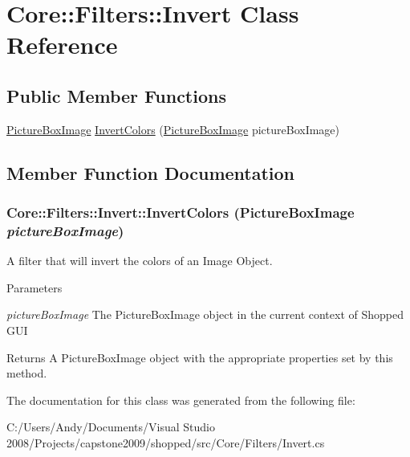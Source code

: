 \hypertarget{class_core_1_1_filters_1_1_invert}{
\section{Core::Filters::Invert Class Reference}
\label{class_core_1_1_filters_1_1_invert}
}
\subsection*{Public Member Functions}
\begin{DoxyCompactItemize}
\item 
\hyperlink{class_core_1_1_images_1_1_picture_box_image}{PictureBoxImage} \hyperlink{class_core_1_1_filters_1_1_invert_a274842c385d73bd131e76e6875f16278}{InvertColors} (\hyperlink{class_core_1_1_images_1_1_picture_box_image}{PictureBoxImage} pictureBoxImage)
\end{DoxyCompactItemize}


\subsection{Member Function Documentation}
\hypertarget{class_core_1_1_filters_1_1_invert_a274842c385d73bd131e76e6875f16278}{
\subsubsection[{InvertColors}]{ Core::Filters::Invert::InvertColors ({\bf PictureBoxImage} {\em pictureBoxImage})}}
\label{class_core_1_1_filters_1_1_invert_a274842c385d73bd131e76e6875f16278}
A filter that will invert the colors of an Image Object.


\begin{DoxyParams}{Parameters}
\item[{\em pictureBoxImage}]The PictureBoxImage object in the current context of Shopped GUI \end{DoxyParams}
\begin{DoxyReturn}{Returns}
A PictureBoxImage object with the appropriate properties set by this method. 
\end{DoxyReturn}


The documentation for this class was generated from the following file:\begin{DoxyCompactItemize}
\item 
C:/Users/Andy/Documents/Visual Studio 2008/Projects/capstone2009/shopped/src/Core/Filters/Invert.cs\end{DoxyCompactItemize}
